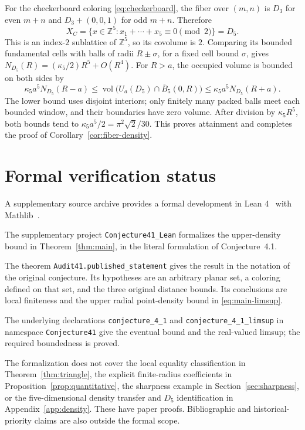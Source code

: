 \documentclass[11pt,a4paper]{article}
\theoremstyle{definition}
\theoremstyle{remark}
\newcommand{\Z}{\mathbb{Z}}
\DeclareMathOperator{\vol}{vol}
\begin{document}
For the checkerboard coloring \eqref{eq:checkerboard}, the fiber
over $(m,n)$ is $D_3$ for even $m+n$ and $D_3+(0,0,1)$ for odd
$m+n$. Therefore
\[
X_C=\{x\in\Z^5:x_1+\cdots+x_5\equiv0\pmod2\}=D_5.
\]
This is an index-$2$ sublattice of $\Z^5$, so its covolume is $2$.
Comparing its bounded fundamental cells with balls of radii
$R\pm\sigma$, for a fixed cell bound $\sigma$, gives
$N_{D_5}(R)=(\kappa_5/2)R^5+O(R^4)$.
For $R>a$, the occupied volume is bounded on both sides by
\[
\kappa_5a^5N_{D_5}(R-a)
\leq\vol\bigl(U_a(D_5)\cap\overline B_5(0,R)\bigr)
\leq\kappa_5a^5N_{D_5}(R+a).
\]
The lower bound uses disjoint interiors; only finitely many packed
balls meet each bounded window, and their boundaries have zero volume.
After division by $\kappa_5R^5$, both bounds tend to
$\kappa_5a^5/2=\pi^2\sqrt2/30$. This proves attainment and completes
the proof of Corollary~\ref{cor:fiber-density}.

\section{Formal verification status}
\label{app:formal}

A supplementary source archive provides a formal development in
Lean 4~\cite{Lean4} with Mathlib~\cite{Mathlib}.

The supplementary project \texttt{Conjecture41\_Lean} formalizes the
upper-density bound in Theorem~\ref{thm:main}, in the literal formulation
of Conjecture~4.1.

The theorem \texttt{Audit41.published\_statement} gives the result in
the notation of the original conjecture. Its hypotheses are an arbitrary
planar set, a coloring defined on that set, and the three original
distance bounds. Its conclusions are local finiteness and the upper
radial point-density bound in \eqref{eq:main-limsup}.

The underlying declarations
\texttt{conjecture\_4\_1} and \texttt{conjecture\_4\_1\_limsup}
in namespace \texttt{Conjecture41} give the eventual bound and the
real-valued limsup; the required boundedness is proved.

The formalization does not cover the local equality classification in
Theorem~\ref{thm:triangle}, the explicit finite-radius coefficients in
Proposition~\ref{prop:quantitative}, the sharpness example in
Section~\ref{sec:sharpness}, or the five-dimensional density transfer and
$D_5$ identification in Appendix~\ref{app:density}.
These have paper proofs. Bibliographic and historical-priority claims
are also outside the formal scope.
\end{document}
